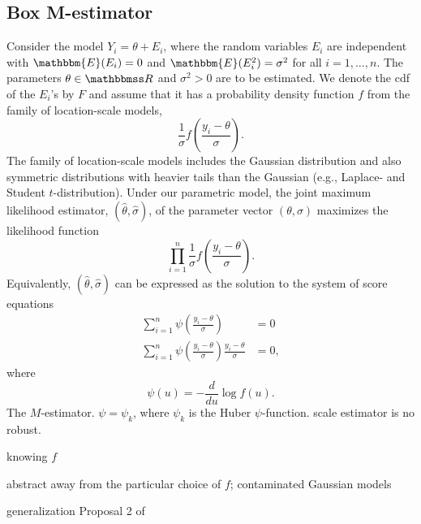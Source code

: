 \documentclass[a4paper,11pt]{scrreprt}
\theoremstyle{remark}
\begin{document}
\subsection{Box M-estimator}
Consider the model $Y_i = \theta + E_i$, where the random variables $E_i$ are independent with $\mathbbm{E}(E_i)=0$ and $\mathbbm{E}(E_i^2)=\sigma^2$ for all $i=1,\ldots,n$. The parameters $\theta \in \R$ and $\sigma^2 > 0$ are to be estimated. We denote the cdf of the $E_i$'s by $F$ and assume that it has a probability density function $f$ from the family of location-scale models, 
\begin{equation*}
   \frac{1}{\sigma}f\left( \frac{y_i - \theta}{\sigma}\right).
\end{equation*}
\noindent The family of location-scale models includes the Gaussian distribution and also symmetric distributions with heavier tails than the Gaussian (e.g., Laplace- and Student $t$-distribution). Under our parametric model, the joint maximum likelihood estimator, $(\hat{\theta}, \hat{\sigma})$, of the parameter vector $(\theta, \sigma)$ maximizes the likelihood function 
\begin{equation*}
   \prod_{i=1}^n  \frac{1}{\sigma}f\left( \frac{y_i - \theta}{\sigma}\right).
\end{equation*}
\noindent Equivalently, $(\hat{\theta}, \hat{\sigma})$ can be expressed as the solution to the system of score equations
\begin{align}
   \sum_{i=1}^n \psi\left( \frac{y_i - \theta}{\sigma}\right) &= 0 \\
   \sum_{i=1}^n \psi\left( \frac{y_i - \theta}{\sigma}\right) \frac{y_i - \theta}{\sigma} &= 0, 
\end{align}
\noindent where
\begin{equation*}
   \psi(u) = -\frac{d}{d u} \log f(u).
\end{equation*}
\noindent The $M$-estimator. $\psi = \psi_k$, where $\psi_k$ is the Huber $\psi$-function.  scale estimator is no robust.

knowing $f$

abstract away from the particular choice of $f$; contaminated Gaussian models 

generalization Proposal 2 of \citet{huber1964}  



\end{document}

